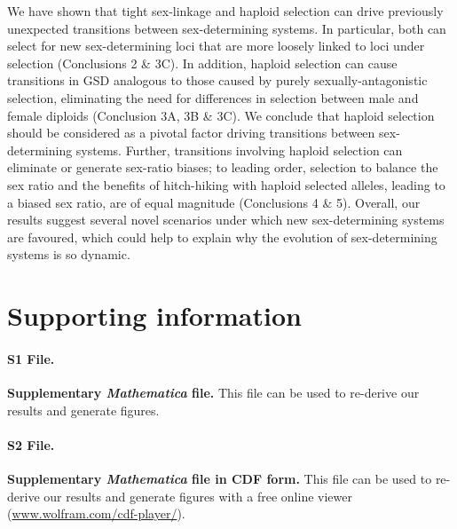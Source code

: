 \documentclass[10pt,letterpaper]{article}
\begin{document}
We have shown that tight sex-linkage and haploid selection can drive previously unexpected transitions between sex-determining systems.
In particular, both can select for new sex-determining loci that are more loosely linked to loci under selection (Conclusions 2 \& 3C). 
In addition, haploid selection can cause transitions in GSD analogous to those caused by purely sexually-antagonistic selection, eliminating the need for differences in selection between male and female diploids (Conclusion 3A, 3B \& 3C).
We conclude that haploid selection should be considered as a pivotal factor driving transitions between sex-determining systems. 
Further, transitions involving haploid selection can eliminate or generate sex-ratio biases; to leading order, selection to balance the sex ratio and the benefits of hitch-hiking with haploid selected alleles, leading to a biased sex ratio, are of equal magnitude (Conclusions 4 \& 5). 
Overall, our results suggest several novel scenarios under which new sex-determining systems are favoured, which could help to explain why the evolution of sex-determining systems is so dynamic. 






\section*{Supporting information}

\paragraph*{S1 File.}
\label{file:Mathematica}
{\bf Supplementary \textit{Mathematica} file.}  This file can be used to re-derive our results and generate figures. 

\paragraph*{S2 File.}
\label{file:MathematicaCDF}
{\bf Supplementary \textit{Mathematica} file in CDF form.}  This file can be used to re-derive our results and generate figures with a free online viewer (\hyperref[www.wolfram.com/cdf-player/]{www.wolfram.com/cdf-player/}). 
\end{document}
